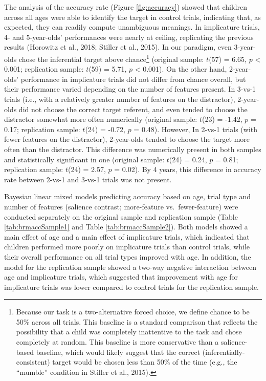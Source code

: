 \documentclass[mask,man]{apa6}
\begin{document}
The analysis of the accuracy rate (Figure \ref{fig:accuracy}) showed
that children across all ages were able to identify the target in
control trials, indicating that, as expected, they can readily compute
unambiguous meanings. In implicature trials, 4- and 5-year-olds'
performances were nearly at ceiling, replicating the previous results
(Horowitz et al., 2018; Stiller et al., 2015). In our paradigm, even
3-year-olds chose the inferential target above chance\footnote{Because
  our task is a two-alternative forced choice, we define chance to be
  50\% across all trials. This baseline is a standard comparison that
  reflects the possibility that a child was completely inattentive to
  the task and chose completely at random. This baseline is more
  conservative than a salience-based baseline, which would likely
  suggest that the correct (inferentially-consistent) target would be
  chosen less than 50\% of the time (e.g., the \enquote{mumble}
  condition in Stiller et al., 2015).} (original sample: \(t\)(57) =
6.65, \(p\) \textless{} 0.001; replication sample: \(t\)(59) = 5.71,
\(p\) \textless{} 0.001). On the other hand, 2-year-olds' performance in
implicature trials did not differ from chance overall, but their
performance varied depending on the number of features present. In
3-vs-1 trials (i.e., with a relatively greater number of features on the
distractor), 2-year-olds did not choose the correct target referent, and
even tended to choose the distractor somewhat more often numerically
(original sample: \(t\)(23) = -1.42, \(p\) = 0.17; replication sample:
\(t\)(24) = -0.72, \(p\) = 0.48). However, In 2-vs-1 trials (with fewer
features on the distractor), 2-year-olds tended to choose the target
more often than the distractor. This difference was numerically present
in both samples and statistically significant in one (original sample:
\(t\)(24) = 0.24, \(p\) = 0.81; replication sample: \(t\)(24) = 2.57,
\(p\) = 0.02). By 4 years, this difference in accuracy rate between
2-vs-1 and 3-vs-1 trials was not present.

Bayesian linear mixed models predicting accuracy based on age, trial
type and number of features (salience contrast; more-feature
vs.~fewer-feature) were conducted separately on the original sample and
replication sample (Table \ref{tab:brmaccSample1} and Table
\ref{tab:brmaccSample2}). Both models showed a main effect of age and a
main effect of implicature trials, which indicated that children
performed more poorly on implicature trials than control trials, while
their overall performance on all trial types improved with age. In
addition, the model for the replication sample showed a two-way negative
interaction between age and implicature trials, which suggested that
improvement with age for implicature trials was lower compared to
control trials for the replication sample.
\end{document}
